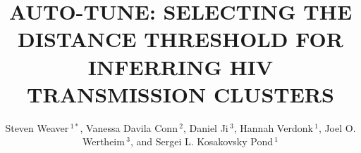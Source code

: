 \documentclass[utf8]{FrontiersinHarvard} %
\def\firstAuthorLast{Weaver {et~al.}} %
\def\Authors{Steven Weaver\,$^{1*}$, Vanessa Davila Conn\,$^{2}$, Daniel Ji\,$^{3}$, Hannah Verdonk\,$^{1}$, Joel O. Wertheim\,$^{3}$, and Sergei L. Kosakovsky Pond\,$^{1}$}
\begin{document}
\onecolumn
{}

\title { AUTO-TUNE: SELECTING THE DISTANCE THRESHOLD FOR INFERRING HIV TRANSMISSION CLUSTERS }

\author[\firstAuthorLast ]{\Authors} %
\address{} %
\correspondance{} %

\extraAuth{}%

\maketitle
\end{document}
